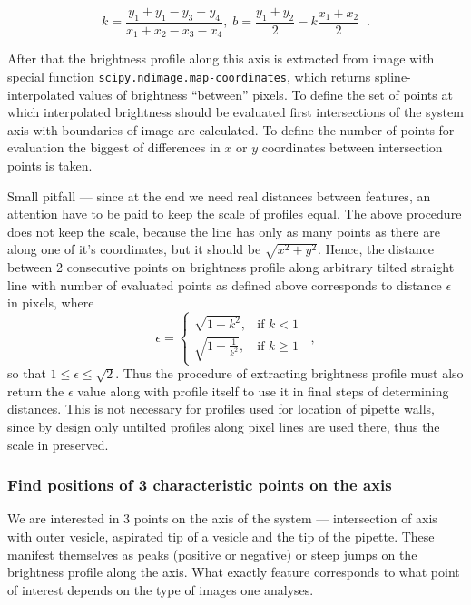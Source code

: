 \begin{equation}
k = \frac{y_1+y_1-y_3-y_4}{x_1+x_2-x_3-x_4}, \; b = \frac{y_1+y_2}{2} - k\frac{x_1+x_2}{2}\;\;.
\label{eq:axis}
\end{equation}

After that the brightness profile along this axis is extracted from image with special function \texttt{scipy.ndimage.map-coordinates}, which returns spline-interpolated values of brightness ``between'' pixels. To define the set of points at which interpolated brightness should be evaluated first intersections of the system axis with boundaries of image are calculated. To define the number of points for evaluation the biggest of differences in $x$ or $y$ coordinates between intersection points is taken.

Small pitfall --- since at the end we need real distances between features, an attention have to be paid to keep the scale of profiles equal. The above procedure does not keep the scale, because the line has only as many points as there are along one of it's coordinates, but it should be $\sqrt{x^2+y^2}$. Hence, the distance between 2 consecutive points on brightness profile along arbitrary tilted straight line with number of evaluated points as defined above corresponds to distance $\epsilon$ in pixels, where
\begin{equation}
\epsilon = \left\{
\begin{array}{ll}
	\sqrt{1+k^2},&\text{if }k < 1\\
	\sqrt{1+\frac{1}{k^2}},&\text{if } k \geq 1 
\end{array}
\right.\;\;,
\label{eq:profilescale}
\end{equation}
so that $1 \leq \epsilon \leq \sqrt{2}$. Thus the procedure of extracting brightness profile must also return the $\epsilon$ value along with profile itself to use it in final steps of determining distances. This is not necessary for profiles used for location of pipette walls, since by design only untilted profiles along pixel lines are used there, thus the scale in preserved.

\subsubsection{Find positions of 3 characteristic points on the axis}\label{points}

We are interested in 3 points on the axis of the system --- intersection of axis with outer vesicle, aspirated tip of a vesicle and the tip of the pipette. These manifest themselves as peaks (positive or negative) or steep jumps on the brightness profile along the axis. What exactly feature corresponds to what point of interest depends on the type of images one analyses.

